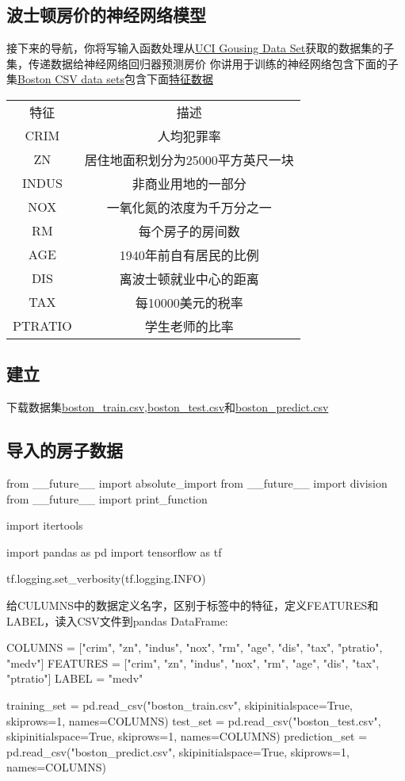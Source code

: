 \subsection{波士顿房价的神经网络模型}
接下来的导航，你将写输入函数处理从\href{https://archive.ics.uci.edu/ml/datasets/Housing}{UCI Gousing Data Set}获取的数据集的子集，传递数据给神经网络回归器预测房价
你讲用于训练的神经网络包含下面的子集\href{https://www.tensorflow.org/get_started/input_fn#setup}{Boston CSV data sets}包含下面\href{https://archive.ics.uci.edu/ml/machine-learning-databases/housing/housing.names}{特征数据}
\begin{tabular}{|c|c|}
\hline
特征&描述\\
CRIM&人均犯罪率\\
ZN&居住地面积划分为25000平方英尺一块\\
INDUS&非商业用地的一部分\\
NOX&一氧化氮的浓度为千万分之一\\
RM&每个房子的房间数\\
AGE&1940年前自有居民的比例\\
DIS&离波士顿就业中心的距离\\
TAX&每10000美元的税率\\
PTRATIO&学生老师的比率
\end{tabular}
\subsection{建立}
下载数据集\href{http://download.tensorflow.org/data/boston_train.csv}{boston_train.csv},\href{http://download.tensorflow.org/data/boston_test.csv}{boston_test.csv}和\href{http://download.tensorflow.org/data/boston_predict.csv}{boston_predict.csv}
\subsection{导入的房子数据}
\begin{python}
from __future__ import absolute_import
from __future__ import division
from __future__ import print_function

import itertools

import pandas as pd
import tensorflow as tf

tf.logging.set_verbosity(tf.logging.INFO)
\end{python}
给CULUMNS中的数据定义名字，区别于标签中的特征，定义FEATURES和LABEL，读入CSV文件到pandas DataFrame:
\begin{python}
COLUMNS = ["crim", "zn", "indus", "nox", "rm", "age",
           "dis", "tax", "ptratio", "medv"]
FEATURES = ["crim", "zn", "indus", "nox", "rm",
            "age", "dis", "tax", "ptratio"]
LABEL = "medv"

training_set = pd.read_csv("boston_train.csv", skipinitialspace=True,
                           skiprows=1, names=COLUMNS)
test_set = pd.read_csv("boston_test.csv", skipinitialspace=True,
                       skiprows=1, names=COLUMNS)
prediction_set = pd.read_csv("boston_predict.csv", skipinitialspace=True,
                             skiprows=1, names=COLUMNS)
\end{python}
